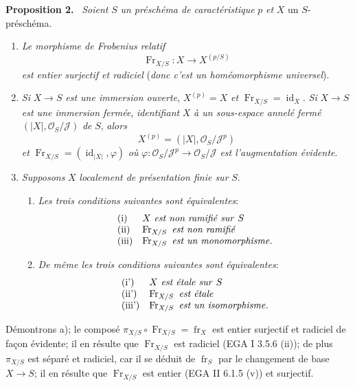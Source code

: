 \documentclass[11pt]{article}
\newenvironment{statement}[1]{\par\medskip\noindent\textbf{#1.}\ }{\par\medskip}
\providecommand{\OO}{\mathcal{O}}
\providecommand{\id}{\operatorname{id}}
\providecommand{\id}{\operatorname{id}}
\providecommand{\id}{\operatorname{id}}
\providecommand{\id}{\operatorname{id}}
\providecommand{\id}{\operatorname{id}}
\providecommand{\fr}{\operatorname{fr}}
\providecommand{\Fr}{\operatorname{Fr}}
\providecommand{\JJ}{\mathcal J}
\providecommand{\Fr}{\operatorname{Fr}}
\providecommand{\fr}{\operatorname{fr}}
\providecommand{\id}{\operatorname{id}}
\begin{document}
\begin{statement}{Proposition 2}
\emph{Soient} $S$ \emph{un préschéma de caractéristique} $p$ \emph{et} $X$ un $S$-préschéma.
\begin{enumerate}[label=\alph*)]
\item \emph{Le morphisme de Frobenius relatif}
\[
\Fr_{X/S}:X\longrightarrow X^{(p/S)}
\]
\emph{est entier surjectif et radiciel} (\emph{donc c'est un homéomorphisme universel}).

\item \emph{Si} $X\to S$ \emph{est une
immersion ouverte}, $X^{(p)}=X$ \emph{et} $\Fr_{X/S}=\id_X$. \emph{Si} $X\to S$ \emph{est une immersion fermée}, \emph{identifiant} $X$ \emph{à un sous-espace annelé fermé} $(|X|,\OO_S/\JJ)$ \emph{de} $S$, \emph{alors}
\[
X^{(p)}=(|X|,\OO_S/\JJ^p)
\]
\emph{et} $\Fr_{X/S}=(\id_{|X|},\varphi)$ \emph{où} $\varphi:\OO_S/\JJ^p\to\OO_S/\JJ$ \emph{est l'augmentation évidente}.

\item \emph{Supposons} $X$ \emph{localement de présentation finie sur} $S$.
\begin{enumerate}[label=\arabic*)]
\item \emph{Les trois conditions suivantes sont équivalentes}:
\[
\begin{array}{ll}
\text{(i)}& X\text{ \emph{est non ramifié sur} }S\\
\text{(ii)}& \Fr_{X/S}\text{ \emph{est non ramifié}}\\
\text{(iii)}& \Fr_{X/S}\text{ \emph{est un monomorphisme}}.
\end{array}
\]
\item \emph{De même les trois conditions suivantes sont équivalentes}:
\[
\begin{array}{ll}
\text{(i')}& X\text{ \emph{est étale sur} }S\\
\text{(ii')}& \Fr_{X/S}\text{ \emph{est étale}}\\
\text{(iii')}& \Fr_{X/S}\text{ \emph{est un isomorphisme}}.
\end{array}
\]
\end{enumerate}
\end{enumerate}
\end{statement}

Démontrons a); le composé $\pi_{X/S}\circ\Fr_{X/S}=\fr_X$ est entier surjectif et radiciel de façon évidente; il en résulte que $\Fr_{X/S}$ est radiciel (EGA I 3.5.6 (ii)); de plus $\pi_{X/S}$ est séparé et radiciel, car il se déduit de $\fr_S$ par le changement de base $X\to S$; il en résulte que $\Fr_{X/S}$ est entier (EGA II 6.1.5 (v)) et surjectif.
\end{document}
